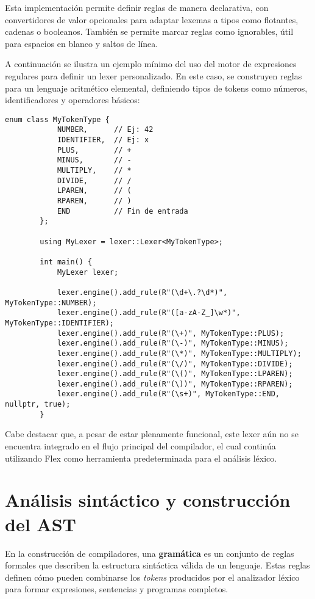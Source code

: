 \documentclass{llncs}
\begin{document}
	Esta implementación permite definir reglas de manera declarativa, con convertidores de valor opcionales para adaptar lexemas a tipos como flotantes, cadenas o booleanos. También se permite marcar reglas como ignorables, útil para espacios en blanco y saltos de línea.

	\vspace{1em}
	A continuación se ilustra un ejemplo mínimo del uso del motor de expresiones regulares para definir un lexer personalizado. En este caso, se construyen reglas para un lenguaje aritmético elemental, definiendo tipos de tokens como números, identificadores y operadores básicos:

	\begin{lstlisting}[language=HulkCpp, caption={Ejemplo de configuración de un lexer personalizado mediante expresiones regulares}, label={lst:custom-lexer}]
		enum class MyTokenType {
			NUMBER,      // Ej: 42
			IDENTIFIER,  // Ej: x
			PLUS,        // +
			MINUS,       // -
			MULTIPLY,    // *
			DIVIDE,      // /
			LPAREN,      // (
			RPAREN,      // )
			END          // Fin de entrada
		};
		
		using MyLexer = lexer::Lexer<MyTokenType>;

		int main() {
			MyLexer lexer;
			
			lexer.engine().add_rule(R"(\d+\.?\d*)", MyTokenType::NUMBER);
			lexer.engine().add_rule(R"([a-zA-Z_]\w*)", MyTokenType::IDENTIFIER);
			lexer.engine().add_rule(R"(\+)", MyTokenType::PLUS);
			lexer.engine().add_rule(R"(\-)", MyTokenType::MINUS);
			lexer.engine().add_rule(R"(\*)", MyTokenType::MULTIPLY);
			lexer.engine().add_rule(R"(\/)", MyTokenType::DIVIDE);
			lexer.engine().add_rule(R"(\()", MyTokenType::LPAREN);
			lexer.engine().add_rule(R"(\))", MyTokenType::RPAREN);
			lexer.engine().add_rule(R"(\s+)", MyTokenType::END, nullptr, true); 
		}
	\end{lstlisting}
		


	Cabe destacar que, a pesar de estar plenamente funcional, este lexer aún no se encuentra integrado en el flujo principal del compilador, el cual continúa utilizando Flex como herramienta predeterminada para el análisis léxico.

	\section{Análisis sintáctico y construcción del AST}

	En la construcción de compiladores, una \textbf{gramática} es un conjunto de reglas formales que describen la estructura sintáctica válida de un lenguaje. Estas reglas definen cómo pueden combinarse los \textit{tokens} producidos por el analizador léxico para formar expresiones, sentencias y programas completos. 
	
\end{document}
